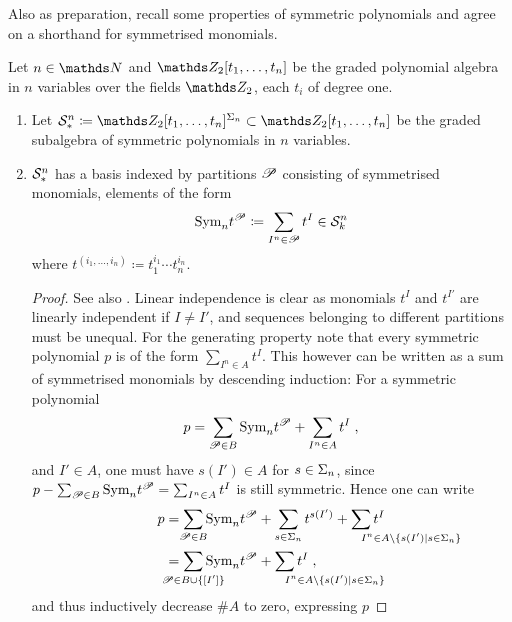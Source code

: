 Also as preparation, recall some properties of symmetric polynomials
and agree on a shorthand for symmetrised monomials.
\begin{LemDef}
  Let $n\in\Nat$ and $\Zmod2[t_1,\dotsc,t_n]$ be the graded polynomial
  algebra in $n$ variables over the fields $\Zmod2$, each $t_i$ of
  degree one.
  \begin{enumerate}
  \item Let
    $\Symm{n}_*
    \coloneqq \Zmod2[t_1,\dotsc,t_n]^{\Permutations{n}}
    \subset \Zmod2[t_1,\dotsc,t_n]$
    be the graded subalgebra of symmetric polynomials in $n$ variables.
  \item $\mathcal{S}^{n}_*$ has a basis indexed by partitions $\mathscr{P}$
    consisting of symmetrised monomials, \idest elements of the form
    \begin{gather*}
      \text{\normalfont Sym}_{n} t^{\mathscr{P}} \coloneqq \sum_{I^n\in\mathscr{P}} t^I \in \mathcal{S}^{n}_k
    \end{gather*}
    where $t^{(i_1,\dotsc,i_n)}\coloneqq t_1^{i_1}\dotsm t_n^{i_n}$.
    \begin{proof}
      See also \cite[footnote~2, p.~154]{thom}.
      Linear independence is clear as monomials $t^I$ and $t^{I'}$ are
      linearly independent if $I\neq I'$, and sequences belonging to
      different partitions must be unequal.
      For the generating property note that every symmetric polynomial
      $p$ is of the form $\sum_{I^n\in A}t^I$. This
      however can be written as a sum of symmetrised monomials by
      descending induction:
      For a symmetric polynomial
      \begin{gather*}
        p
        = \sum_{\mathscr{P}\in B}\text{\normalfont Sym}_{n} t^{\mathscr{P}}  + \sum_{I^n\in A}t^I
        \;,
      \end{gather*}
      and $I'\in A$, one must have $s(I')\in A$ for
      $s\in\Sigma_{n}$, since
      $p-\sum_{\mathscr{P}\in B}\text{\normalfont Sym}_{n} t^{\mathscr{P}} = \sum_{I^n\in A}t^I$
      is still symmetric.
      Hence one can write
      \begin{align*}
        p
        &= \sum_{\mathclap{\Part\in B}}\symm{n} t^{\Part}
          + \sum_{s\in\Permutations{n}}t^{s(I')}
          + \sum_{\mathrlap{
          I^n\in A\setminus\{s(I')|s\in\Permutations{n}\}
          }} t^I
        \\
        &= \sum_{\mathclap{\Part\in B\cup\{[I']\}}}\symm{n} t^{\Part}
          + \sum_{\mathrlap{
            I^n\in A\setminus\{s(I')|s\in\Permutations{n}\}
          }} t^I
        \;,
      \end{align*}
      and thus inductively decrease $\# A$ to zero, expressing $p$

\end{proof}
\end{enumerate}
\end{LemDef}
